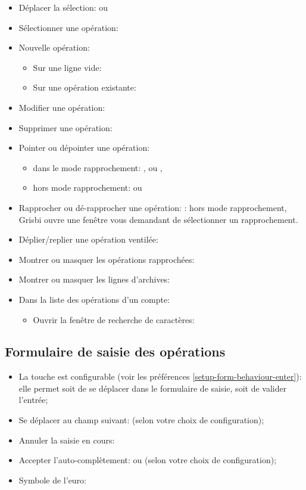 \begin{itemize}
	\item Déplacer la sélection: \keys{\arrowkeyup} ou \keys{\arrowkeydown}
	\item Sélectionner une opération: 
	\item Nouvelle opération:
		\begin{itemize}
			\item Sur une ligne vide: 
			\item Sur une opération existante: 
		\end{itemize}
	\item Modifier une opération: 
	\item Supprimer une opération: 
	\item Pointer ou dépointer une opération:
		\begin{itemize}
			\item dans le mode rapprochement: ,  ou ,
			\item hors mode rapprochement:  ou 
		\end{itemize}
	\item Rapprocher ou dé-rapprocher une opération: \newline
	\Note{}: hors mode rapprochement, Grisbi ouvre une fenêtre vous demandant de sélectionner un rapprochement.
	\item Déplier/replier une opération ventilée: 
	\item Montrer ou masquer les opérations rapprochées: 
	\item Montrer ou masquer les lignes d'archives: 
	\item Dans la liste des opérations d'un compte:
		\begin{itemize}
			\item Ouvrir la fenêtre de recherche de caractères: 
		\end{itemize}
\end{itemize}


\subsection{Formulaire de saisie des opérations}

\begin{itemize}
	\item La touche  est configurable (voir les préférences \vref{setup-form-behaviour-enter}): elle permet soit de se déplacer dans le formulaire de saisie, soit de valider l'entrée;
	\item Se déplacer au champ suivant:  (selon votre choix de configuration);
	\item Annuler la saisie en cours: \keys{\esc}
	\item Accepter l'auto-complètement:  ou  (selon votre choix de configuration);
	\item Symbole de l'euro: 
\end{itemize}


